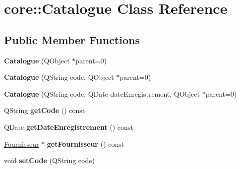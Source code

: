 \hypertarget{classcore_1_1_catalogue}{
\section{core::Catalogue Class Reference}
\label{d6/d6b/classcore_1_1_catalogue}
}
\subsection*{Public Member Functions}
\begin{DoxyCompactItemize}
\item 
\hypertarget{classcore_1_1_catalogue_a77ec991a4d9af1134b6a4c304a940b0c}{
{\bfseries Catalogue} (QObject $\ast$parent=0)}
\label{d6/d6b/classcore_1_1_catalogue_a77ec991a4d9af1134b6a4c304a940b0c}

\item 
\hypertarget{classcore_1_1_catalogue_a12fdc8debf453b3f01979ee4d5546bcd}{
{\bfseries Catalogue} (QString code, QObject $\ast$parent=0)}
\label{d6/d6b/classcore_1_1_catalogue_a12fdc8debf453b3f01979ee4d5546bcd}

\item 
\hypertarget{classcore_1_1_catalogue_ada77c55480618ea1f3d854b6918ab2e4}{
{\bfseries Catalogue} (QString code, QDate dateEnregistrement, QObject $\ast$parent=0)}
\label{d6/d6b/classcore_1_1_catalogue_ada77c55480618ea1f3d854b6918ab2e4}

\item 
\hypertarget{classcore_1_1_catalogue_ad9040f2caf0bc90bf9f1f77bc3da9175}{
QString {\bfseries getCode} () const }
\label{d6/d6b/classcore_1_1_catalogue_ad9040f2caf0bc90bf9f1f77bc3da9175}

\item 
\hypertarget{classcore_1_1_catalogue_ac9a9fc872e3ac85de35a053ec10e5cee}{
QDate {\bfseries getDateEnregistrement} () const }
\label{d6/d6b/classcore_1_1_catalogue_ac9a9fc872e3ac85de35a053ec10e5cee}

\item 
\hypertarget{classcore_1_1_catalogue_aed63b463573c4c71f8e7c9366d54fb5a}{
\hyperlink{class_fournisseur}{Fournisseur} $\ast$ {\bfseries getFournisseur} () const }
\label{d6/d6b/classcore_1_1_catalogue_aed63b463573c4c71f8e7c9366d54fb5a}

\item 
\hypertarget{classcore_1_1_catalogue_a3e5f3c1aabda2d9ff3a6e047609056e8}{
void {\bfseries setCode} (QString code)}
\label{d6/d6b/classcore_1_1_catalogue_a3e5f3c1aabda2d9ff3a6e047609056e8}


\end{DoxyCompactItemize}
